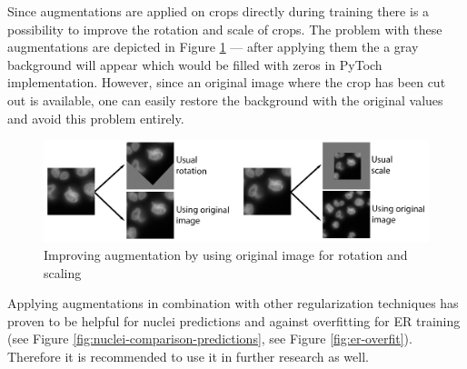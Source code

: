 Since augmentations are applied on crops directly during training there is a possibility to improve the rotation and scale of crops. The problem with these augmentations are depicted in Figure \ref{fig:smart-augments} --- after applying them the a gray background will appear which would be filled with zeros in PyToch implementation. However, since an original image where the crop has been cut out is available, one can easily restore the background with the original values and avoid this problem entirely.

\begin{figure}[H]
	\begin{center}
		\includegraphics[width=0.7\linewidth]{bilder/model training/smart augmentations.png}
		\caption{Improving augmentation by using original image for rotation and scaling}\label{fig:smart-augments}
	\end{center}
\end{figure}

Applying augmentations in combination with other regularization techniques has proven to be helpful for nuclei predictions and against overfitting for ER training (see Figure \ref{fig:nuclei-comparison-predictions}, see Figure \ref{fig:er-overfit}). Therefore it is recommended to use it in further research as well.
